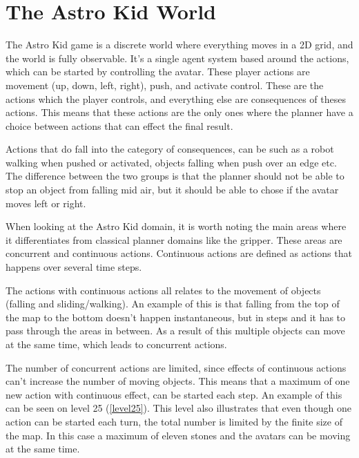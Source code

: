 	\chapter{The Astro Kid World}
	The Astro Kid game is a discrete world where everything moves in a 2D grid, and the world is fully observable. It's a single agent system based around the actions, which can be started by controlling the avatar. These player actions are movement (up, down, left, right), push, and activate control. These are the actions which the player controls, and everything else are consequences of theses actions. This means that these actions are the only ones where the planner have a choice between actions that can effect the final result. 
	
	
	Actions that do fall into the category of consequences, can be such as a robot walking when pushed or activated, objects falling when push over an edge etc. The difference between the two groups is that the planner should not be able to stop an object from falling mid air, but it should be able to chose if the avatar moves left or right. 
	

	When looking at the Astro Kid domain, it is worth noting the main areas where it differentiates from classical planner domains like the gripper. These areas are concurrent and continuous actions. Continuous actions are defined as actions that happens over several time steps. 

	The actions with continuous actions all relates to the movement of objects (falling and sliding/walking). An example of this is that falling from the top of the map to the bottom doesn't happen instantaneous, but in steps and it has to pass through the areas in between. As a result of this multiple objects can move at the same time, which leads to concurrent actions.
	
	The number of concurrent actions are limited, since effects of continuous actions can't increase the number of moving objects. This means that a maximum of one new action with continuous effect, can be started each step. An example of this can be seen on level 25 (\ref{level25}). This level also illustrates that even though one action can be started each turn, the total number is limited by the finite size of the map. In this case a maximum of eleven stones and the avatars can be moving at the same time.

